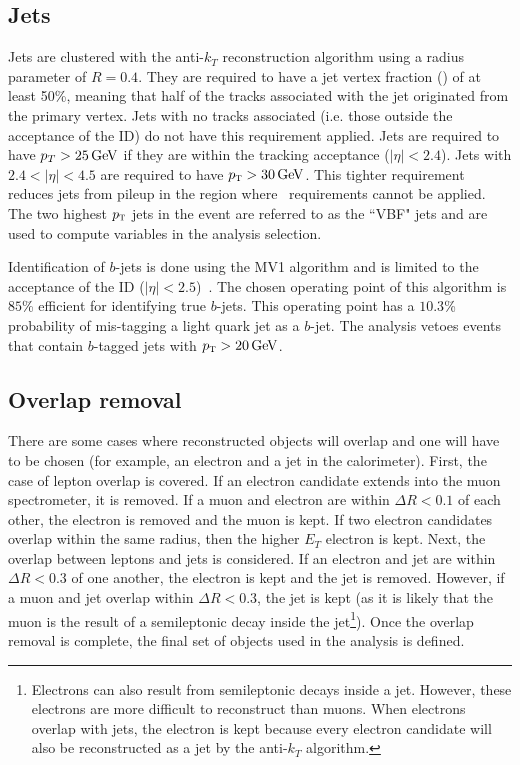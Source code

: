 \subsection{Jets}

Jets are clustered with the anti-$k_T$ reconstruction algorithm using a radius parameter of $R=0.4$. They are required to have a jet vertex fraction (\jvf) of at least 50\%, meaning that half of the tracks associated with the jet originated from the primary vertex. Jets with no tracks associated (i.e. those outside the acceptance of the ID) do not have this requirement applied. Jets are required to have $p_{T} > 25 \GeV$ if they are within the tracking acceptance ($|\eta| < 2.4$). Jets with $2.4 < |\eta| < 4.5$ are required to have $\pT > 30 \GeV$. This tighter requirement reduces jets from pileup in the region where \jvf\, requirements cannot be applied. The two highest $p_{\textrm{\footnotesize\sc t}}$ jets in the event are referred to as the ``VBF" jets and are used to compute variables in the analysis selection. 

Identification of $b$-jets is done using the MV1 algorithm and is limited to the acceptance of the ID ($|\eta| < 2.5$)~\cite{Run1BJets}. The chosen operating point of this algorithm is $85$\% efficient for identifying true $b$-jets. This operating point has a $10.3$\% probability of mis-tagging a light quark jet as a $b$-jet. The analysis vetoes events that contain $b$-tagged jets with $\pT > 20 \GeV$. 

\subsection{Overlap removal}

There are some cases where reconstructed objects will overlap and one will have to be chosen (for example, an electron and a jet in the calorimeter). First, the case of lepton overlap is covered. If an electron candidate extends into the muon spectrometer, it is removed. If a muon and electron are within $\Delta R < 0.1$ of each other, the electron is removed and the muon is kept. If two electron candidates overlap within the same radius, then the higher $E_{T}$ electron is kept. Next, the overlap between leptons and jets is considered. If an electron and jet are within $\Delta R < 0.3$ of one another, the electron is kept and the jet is removed. However, if a muon and jet overlap within $\Delta R < 0.3$, the jet is kept (as it is likely that the muon is the result of a semileptonic decay inside the jet\footnote{Electrons can also result from semileptonic decays inside a jet. However, these electrons are more difficult to reconstruct than muons. When electrons overlap with jets, the electron is kept because every electron candidate will also be reconstructed as a jet by the anti-$k_{T}$ algorithm.}). Once the overlap removal is complete, the final set of objects used in the analysis is defined. 

